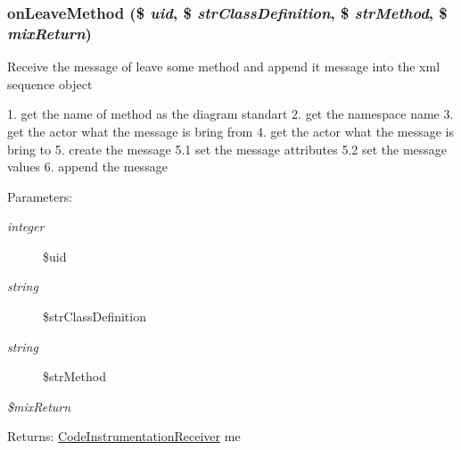 \hypertarget{class_code_instrumentation_receiver_857c9dfbe06ad7cd878585408b1c3d98}{
\subsubsection[{onLeaveMethod}]{\setlength{\rightskip}{0pt plus 5cm}onLeaveMethod (\$ {\em uid}, \/  \$ {\em strClassDefinition}, \/  \$ {\em strMethod}, \/  \$ {\em mixReturn})}}
\label{class_code_instrumentation_receiver_857c9dfbe06ad7cd878585408b1c3d98}


Receive the message of leave some method and append it message into the xml sequence object

1. get the name of method as the diagram standart 2. get the namespace name 3. get the actor what the message is bring from 4. get the actor what the message is bring to 5. create the message 5.1 set the message attributes 5.2 set the message values 6. append the message

\begin{Desc}
\item[Parameters:]
\begin{description}
\item[{\em integer}]\$uid \item[{\em string}]\$strClassDefinition \item[{\em string}]\$strMethod \item[{\em \$mixReturn}]\end{description}
\end{Desc}
\begin{Desc}
\item[Returns:]\hyperlink{class_code_instrumentation_receiver}{CodeInstrumentationReceiver} me \end{Desc}


